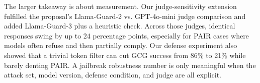 \documentclass{article}
\begin{document}
The larger takeaway is about measurement. Our judge-sensitivity extension fulfilled the proposal's Llama-Guard-2 vs. GPT-4o-mini judge comparison and added Llama-Guard-3 plus a heuristic check. Across those judges, identical responses swing by up to 24 percentage points, especially for PAIR cases where models often refuse and then partially comply. Our defense experiment also showed that a trivial token filter can cut GCG success from 86\% to 21\% while barely denting PAIR. A jailbreak robustness number is only meaningful when the attack set, model version, defense condition, and judge are all explicit.



\end{document}

